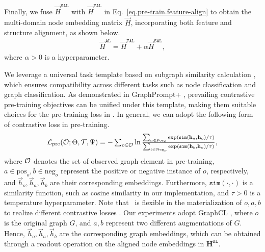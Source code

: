 Finally, we fuse $\Vec{H}^\mathtt{SAL}$ with $\Vec{H}^{\mathtt{FAL}}$ in Eq.~\eqref{eq.pre-train.feature-align}  to obtain the multi-domain node embedding matrix $\vec{H}$, incorporating both feature and structure alignment, as shown below.
\begin{align}\label{eq.source-fusion}
    \vec{H}^{\mathtt{AL}} =\Vec{H}^{\mathtt{FAL}}+\alpha\Vec{H}^\mathtt{SAL},
\end{align}
where $\alpha>0$ is a hyperparameter.

\label{sec.pre-training}
We leverage a universal task template based on subgraph similarity calculation \cite{liu2023graphprompt,yu2023generalized}, which ensures compatibility across different tasks such as node classification and graph classification. %
As demonstrated in GraphPrompt+ \cite{yu2023generalized}, prevailing contrastive pre-training objectives can be unified under this template, making them suitable choices for the pre-training loss in \model. 
In general, we can adopt the following form of contrastive loss in pre-training.
\begin{align}\label{eq:generalized_loss}
     \textstyle     \mathcal{L}_\text{pre}(\mathcal{O};\Theta,\mathcal{T},\Psi)=-\sum_{o\in \mathcal{O}}\ln\frac{\sum_{a\in \text{Pos}_o}\exp(\mathtt{sim}(\mathbf{h}_{a}, \mathbf{h}_{o})/\tau)}{\sum_{b\in \text{Neg}_o}\exp(\mathtt{sim}(\mathbf{h}_{b}, \mathbf{h}_{o})/\tau)},
\end{align}
where $\mathcal{O}$ denotes the set of observed graph element in pre-training, $a\in\text{pos}_o,b\in\text{neg}_o$ represent the positive or negative instance of $o$, respectively, and $\vec{h}_o,\vec{h}_a,\vec{h}_b$ are their corresponding embeddings. 
Furthermore, $\mathtt{sim}(\cdot,\cdot)$ is a similarity function, such as cosine similarity \cite{rahutomo2012semantic} in our implementation, and $\tau>0$ is a temperature hyperparameter. 
Note that \model\ is flexible in the materialization of $o,a,b$ to realize different contrastive losses \cite{yu2023generalized}. Our experiments adopt GraphCL \cite{you2020graph}, where \( o \) is the original graph \( G \), and \( a,b \) represent two different augmentations of  \( G \).
Hence, $\vec{h}_o,\vec{h}_a,\vec{h}_b$ are the corresponding graph embeddings, which can be obtained through a readout operation \cite{liu2023graphprompt} on the aligned node embeddings in $\mathbf{H}^{\mathtt{AL}}$.

